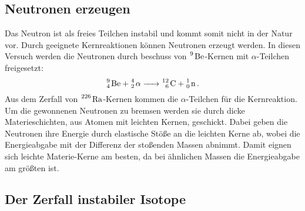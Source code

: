 \subsection{Neutronen erzeugen}
Das Neutron ist als freies Teilchen instabil und kommt somit nicht in der Natur vor. Durch geeignete Kernreaktionen können Neutronen erzeugt werden.
In diesen Versuch werden die Neutronen durch beschuss von $\ce{^9 Be}$-Kernen mit $\alpha$-Teilchen freigesetzt:
\begin{equation*}
    \ce{ ^9_4 Be + ^4_2 $\alpha$ -> ^{12}_6 C + ^1_0 n} \, .
\end{equation*}
Aus dem Zerfall von $\ce{^226 Ra}$-Kernen kommen die $\alpha$-Teilchen für die Kernreaktion. 
Um die gewonnenen Neutronen zu bremsen werden sie durch dicke Materieschichten, aus Atomen mit leichten Kernen, geschickt.
Dabei geben die Neutronen ihre Energie durch elastische Stöße an die leichten Kerne ab, wobei die Energieabgabe mit der Differenz der stoßenden Massen abnimmt.
Damit eignen sich leichte Materie-Kerne am besten, da bei ähnlichen Massen die Energieabgabe am größten ist.
\subsection{Der Zerfall instabiler Isotope}